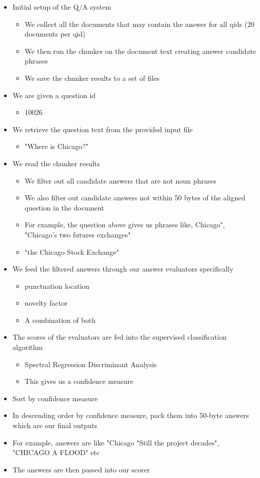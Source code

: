\documentclass{article}
\begin{document}
\begin{itemize}
\item Initial setup of the Q/A system
    \begin{itemize}
    \item We collect all the documents that may contain the answer for all qids (20 documents per qid)
    \item We then run the chunker on the document text creating answer candidate phrases
    \item We save the chunker results to a set of files
    \end{itemize}
\item We are given a question id
    \begin{itemize}
    \item 10026
    \end{itemize}
\item We retrieve the question text from the provided input file
    \begin{itemize}
    \item "Where is Chicago?"
    \end{itemize}
\item We read the chunker results 
    \begin{itemize}
    \item We filter out all candidate answers that are not noun phrases
    \item We also filter out candidate answers not within 50 bytes of the aligned question in the document
    \item For example, the question above gives us phrases like, Chicago", "Chicago's two futures exchanges"
    \item "the Chicago Stock Exchange"
    \end{itemize}
\item We feed the filtered answers through our answer evaluators specifically
    \begin{itemize}
    \item punctuation location
    \item novelty factor
    \item A combination of both
    \end{itemize}
\item The scores of the evaluators are fed into the supervised classification algorithm
    \begin{itemize}
    \item Spectral Regression Discriminant Analysis 
    \item This gives us a confidence measure
    \end{itemize}
\item Sort by confidence measure 
\item In descending order by confidence measure, pack them into 50-byte answers which are our final outputs
\item For example, answers are like "Chicago "Still the project decades", "CHICAGO A FLOOD" etc
\item The answers are then passed into our scorer
\end{itemize}
\end{document}
